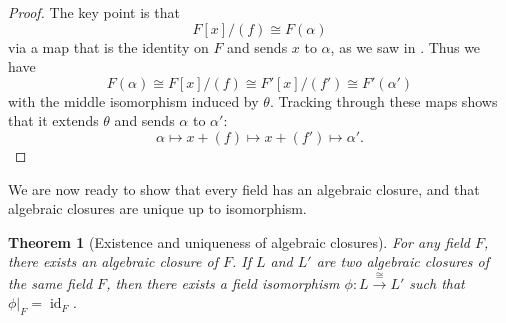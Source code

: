 \documentclass[12pt]{report}
\newtheorem{theorem}{Theorem}[chapter]
\numberwithin{equation}{section}
\numberwithin{theorem}{chapter}
\theoremstyle{definition}
\newtheorem*{basic properties}{Basic Properties}
\newtheorem*{Important Remark}{Important Remark}
\DeclareMathOperator{\id}{id}
\begin{document}
\begin{proof}
The key point is that
$$F[x]/(f) \cong F(\alpha)$$
via a map that is the identity on $F$ and sends $x$ to $\alpha$, as we
saw in . Thus we have
$$F(\alpha) \cong F[x]/(f) \cong F'[x]/(f') \cong F'(\alpha')$$
with the middle isomorphism induced by $\theta$. Tracking through these
maps shows that it extends $\theta$ and sends $\alpha$ to $\alpha'$:
$$\alpha \mapsto x + (f) \mapsto x + (f') \mapsto \alpha'.$$
\end{proof}



We are now ready to show that every field has an algebraic closure, and that algebraic closures are unique up to isomorphism. 

\begin{theorem}[Existence and uniqueness of algebraic closures]\label{existence and uniqueness of algebraic closures}
For any field $F$, there exists an algebraic closure of $F$. If $L$ and $L'$ are two algebraic closures of the same field $F$, then there exists a field isomorphism $\phi: L \xrightarrow{\cong} L'$ such that $\phi|_F = \id_F$.
\end{theorem}

\end{document}
